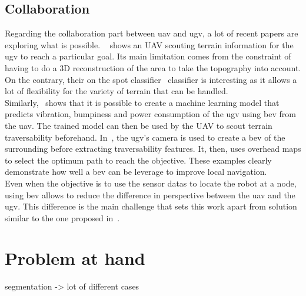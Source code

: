 \subsection{Collaboration}\label{subsec:collaboration}

Regarding the collaboration part between \gls{uav} and \gls{ugv}, a lot of recent papers are exploring what is possible.
~\cite{delmerico_active_2017} shows an UAV scouting terrain information for the \gls{ugv} to reach a particular goal.
Its main limitation comes from the constraint of having to do a 3D reconstruction of the area to take the topography
into account.
On the contrary, their on the spot classifier~\parencite{kulic_--spot_2017} classifier is interesting as it allows
a lot of flexibility for the variety of terrain that can be handled.\\
Similarly,~\cite{fortin_uav-assisted_2024} shows that it is possible to create a machine learning model that predicts
vibration, bumpiness and power consumption of the \gls{ugv} using \gls{bev} from the \gls{uav}.
The trained model can then be used by the UAV to scout terrain traversability beforehand.
In~\cite{zhang_dual-bev_2025}, the \gls{ugv}'s camera is used to create a \gls{bev} of the surrounding before extracting traversability features.
It, then, uses overhead maps to select the optimum path to reach the objective.
These examples clearly demonstrate how well a \gls{bev} can be leverage to improve local navigation.\\
Even when the objective is to use the sensor datas to locate the robot at a node, using \gls{bev} allows to reduce
the difference in perspective between the \gls{uav} and the \gls{ugv}.
This difference is the main challenge that sets this work apart from solution similar to the one proposed in~\cite{han_effective_2020}.






\section{Problem at hand}\label{sec:problem-at-hand}

segmentation -> lot of different cases

